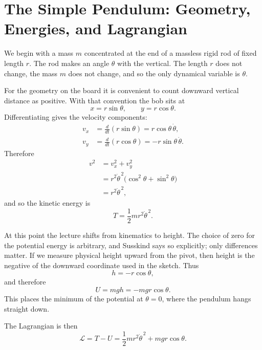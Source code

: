 \section{The Simple Pendulum: Geometry, Energies, and Lagrangian}

We begin with a mass \(m\) concentrated at the end of a massless rigid rod of fixed length \(r\). The rod makes an angle \(\theta\) with the vertical. The length \(r\) does not change, the mass \(m\) does not change, and so the only dynamical variable is \(\theta\).

For the geometry on the board it is convenient to count downward vertical distance as positive. With that convention the bob sits at
\begin{equation}
x=r\sin\theta,
\qquad
y=r\cos\theta.
\end{equation}
Differentiating gives the velocity components:
\begin{align}
v_x &= \frac{d}{dt}(r\sin\theta)=r\cos\theta\,\dot\theta,\\
v_y &= \frac{d}{dt}(r\cos\theta)=-r\sin\theta\,\dot\theta.
\end{align}
Therefore
\begin{align}
v^2
&= v_x^2+v_y^2 \\
&= r^2\dot\theta^{\,2}\bigl(\cos^2\theta+\sin^2\theta\bigr) \\
&= r^2\dot\theta^{\,2},
\end{align}
and so the kinetic energy is
\begin{equation}
T=\frac12 mr^2\dot\theta^{\,2}.
\end{equation}

At this point the lecture shifts from kinematics to height. The choice of zero for the potential energy is arbitrary, and Susskind says so explicitly; only differences matter. If we measure physical height upward from the pivot, then height is the negative of the downward coordinate used in the sketch. Thus
\begin{equation}
h=-r\cos\theta,
\end{equation}
and therefore
\begin{equation}
U=mgh=-mgr\cos\theta.
\end{equation}
This places the minimum of the potential at \(\theta=0\), where the pendulum hangs straight down.

The Lagrangian is then
\begin{equation}
\mathcal{L}
=
T-U
=
\frac12 mr^2\dot\theta^{\,2}+mgr\cos\theta.
\end{equation}

